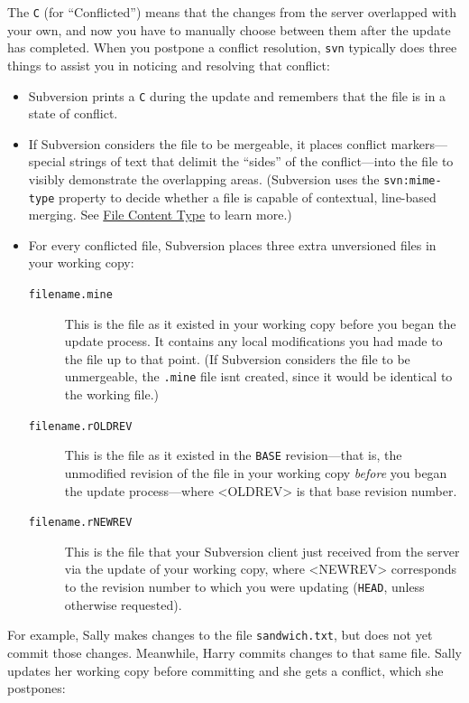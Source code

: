 The \texttt{C} (for ``Conflicted'') means that the changes from the
server overlapped with your own, and now you have to manually choose
between them after the update has completed. When you postpone a
conflict resolution, \texttt{svn} typically does three things to assist
you in noticing and resolving that conflict:

\begin{itemize}
\item
  Subversion prints a \texttt{C} during the update and remembers that
  the file is in a state of conflict.
\item
  If Subversion considers the file to be mergeable, it places conflict
  markers---special strings of text that delimit the ``sides'' of the
  conflict---into the file to visibly demonstrate the overlapping areas.
  (Subversion uses the \texttt{svn:mime-type} property to decide whether
  a file is capable of contextual, line-based merging. See
  \hyperref[svn.advanced.props.special.mime-type]{File Content Type} to
  learn more.)
\item
  For every conflicted file, Subversion places three extra unversioned
  files in your working copy:

  \begin{description}
  \item[\texttt{filename.mine}]
  This is the file as it existed in your working copy before you began
  the update process. It contains any local modifications you had made
  to the file up to that point. (If Subversion considers the file to be
  unmergeable, the \texttt{.mine} file isn\textquotesingle t created,
  since it would be identical to the working file.)
  \item[\texttt{filename.rOLDREV}]
  This is the file as it existed in the \texttt{BASE} revision---that
  is, the unmodified revision of the file in your working copy
  \emph{before} you began the update process---where
  \textless OLDREV\textgreater{} is that base revision number.
  \item[\texttt{filename.rNEWREV}]
  This is the file that your Subversion client just received from the
  server via the update of your working copy, where
  \textless NEWREV\textgreater{} corresponds to the revision number to
  which you were updating (\texttt{HEAD}, unless otherwise requested).
  \end{description}
\end{itemize}

For example, Sally makes changes to the file \texttt{sandwich.txt}, but
does not yet commit those changes. Meanwhile, Harry commits changes to
that same file. Sally updates her working copy before committing and she
gets a conflict, which she postpones:

